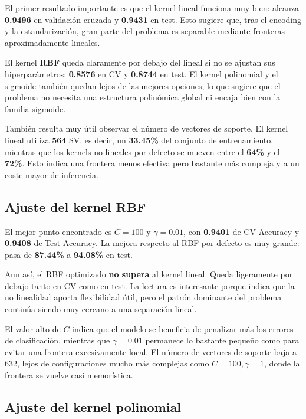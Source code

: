 \documentclass[11pt,a4paper]{article}
\newcommand{\tbl}[3]{
\begin{table}[H]
\centering
\caption{#2}
\label{#3}
\scriptsize

\end{table}
}
\begin{document}
El primer resultado importante es que el kernel lineal funciona muy bien: alcanza \textbf{0.9496} en validación cruzada y \textbf{0.9431} en test. Esto sugiere que, tras el encoding y la estandarización, gran parte del problema es separable mediante fronteras aproximadamente lineales.

El kernel \textbf{RBF} queda claramente por debajo del lineal si no se ajustan sus hiperparámetros: \textbf{0.8576} en CV y \textbf{0.8744} en test. El kernel polinomial y el sigmoide también quedan lejos de las mejores opciones, lo que sugiere que el problema no necesita una estructura polinómica global ni encaja bien con la familia sigmoide.

También resulta muy útil observar el número de vectores de soporte. El kernel lineal utiliza \textbf{564} SV, es decir, un \textbf{33.45\%} del conjunto de entrenamiento, mientras que los kernels no lineales por defecto se mueven entre el \textbf{64\%} y el \textbf{72\%}. Esto indica una frontera menos efectiva pero bastante más compleja y a un coste mayor de inferencia.

\subsection{Ajuste del kernel RBF}

\tbl{svm_rbf_grid}{GridSearch y configuraciones representativas para SVM con kernel RBF.}{tab:svm_rbf}

El mejor punto encontrado es \textbf{\(C = 100\)} y \textbf{\(\gamma = 0.01\)}, con \textbf{0.9401} de CV Accuracy y \textbf{0.9408} de Test Accuracy. La mejora respecto al RBF por defecto es muy grande: pasa de \textbf{87.44\%} a \textbf{94.08\%} en test.

Aun así, el RBF optimizado \textbf{no supera} al kernel lineal. Queda ligeramente por debajo tanto en CV como en test. La lectura es interesante porque indica que la no linealidad aporta flexibilidad útil, pero el patrón dominante del problema continúa siendo muy cercano a una separación lineal.

El valor alto de \(C\) indica que el modelo se beneficia de penalizar más los errores de clasificación, mientras que \(\gamma = 0.01\) permanece lo bastante pequeño como para evitar una frontera excesivamente local. El número de vectores de soporte baja a 632, lejos de configuraciones mucho más complejas como \(C=100, \gamma=1\), donde la frontera se vuelve casi memorística.

\subsection{Ajuste del kernel polinomial}
\end{document}
